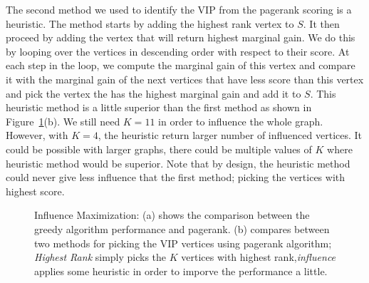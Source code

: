 The second method we used to identify the VIP from the pagerank scoring is a heuristic. The method starts by adding the highest rank vertex to $S$. It then proceed by adding the vertex that will return highest marginal gain. We do this by looping over the vertices in descending order with respect to their score. At each step in the loop, we compute the marginal gain of this vertex and compare it with the marginal gain of the next vertices that have less score than this vertex and pick the vertex the has the highest marginal gain and add it to $S$. This heuristic method is a little superior than the first method as shown in Figure~\ref{fig:inf2}(b). We still need $K=11$ in order to influence the whole graph. However, with $K=4$, the heuristic return larger number of influenced vertices. It could be possible with larger graphs, there could be multiple values of $K$ where heuristic method would be superior. Note that by design, the heuristic method could never give less influence that the first method; picking the vertices with highest score. 


\begin{figure}[!tbh]
\centering        
   
   
   \caption { Influence Maximization: (a) shows the comparison between the greedy algorithm performance and pagerank. (b) compares between two methods for picking the VIP vertices using pagerank algorithm; {\itshape{Highest Rank}} simply picks the $K$ vertices with highest rank,{\itshape{influence}} applies some heuristic in order to imporve the performance a little.}
   \label{fig:inf2}
\end{figure}